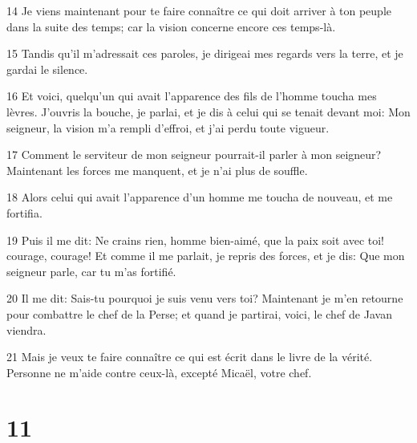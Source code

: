 \par 14 Je viens maintenant pour te faire connaître ce qui doit arriver à ton peuple dans la suite des temps; car la vision concerne encore ces temps-là.
\par 15 Tandis qu'il m'adressait ces paroles, je dirigeai mes regards vers la terre, et je gardai le silence.
\par 16 Et voici, quelqu'un qui avait l'apparence des fils de l'homme toucha mes lèvres. J'ouvris la bouche, je parlai, et je dis à celui qui se tenait devant moi: Mon seigneur, la vision m'a rempli d'effroi, et j'ai perdu toute vigueur.
\par 17 Comment le serviteur de mon seigneur pourrait-il parler à mon seigneur? Maintenant les forces me manquent, et je n'ai plus de souffle.
\par 18 Alors celui qui avait l'apparence d'un homme me toucha de nouveau, et me fortifia.
\par 19 Puis il me dit: Ne crains rien, homme bien-aimé, que la paix soit avec toi! courage, courage! Et comme il me parlait, je repris des forces, et je dis: Que mon seigneur parle, car tu m'as fortifié.
\par 20 Il me dit: Sais-tu pourquoi je suis venu vers toi? Maintenant je m'en retourne pour combattre le chef de la Perse; et quand je partirai, voici, le chef de Javan viendra.
\par 21 Mais je veux te faire connaître ce qui est écrit dans le livre de la vérité. Personne ne m'aide contre ceux-là, excepté Micaël, votre chef.

\chapter{11}

